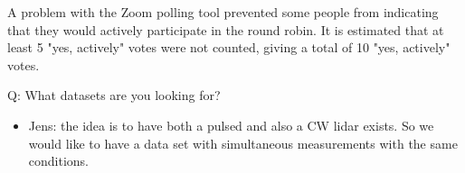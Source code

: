 A problem with the Zoom polling tool prevented some people from
indicating that they would actively participate in the round robin. It
is estimated that at least 5 "yes, actively" votes were not counted,
giving a total of 10 "yes, actively" votes.

Q: What datasets are you looking for?

\begin{itemize}
\item Jens: the idea is to have both a pulsed and also a CW lidar exists. So
  we would like to have a data set with simultaneous measurements with
  the same conditions.
\end{itemize}